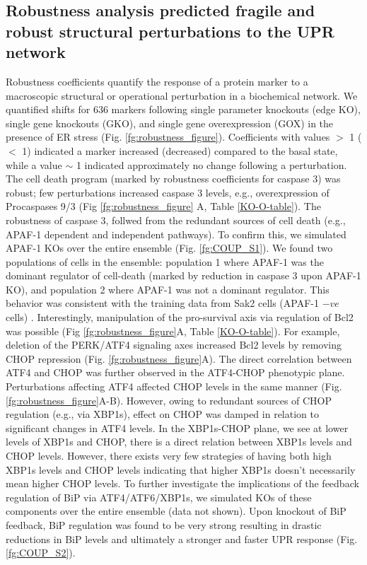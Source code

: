 \documentclass[fleqn,10pt]{wlscirep}
\begin{document}
\subsection*{Robustness analysis predicted fragile and robust structural perturbations to the UPR network}
Robustness coefficients quantify the response of a protein marker to a macroscopic structural or operational perturbation in a biochemical network.
We quantified shifts for 636 markers following single parameter knockouts (edge KO), single gene knockouts (GKO), and single gene overexpression (GOX) in the presence of ER stress (Fig. \ref{fg:robustness_figure}).
Coefficients with values $>$ 1 ($<$ 1) indicated a marker increased (decreased) compared to the basal state, while a value $\sim$ 1 indicated approximately no change following a perturbation.
The cell death program (marked by robustness coefficients for caspase 3) was robust; few perturbations increased caspase 3 levels, e.g., overexpression of Procaspases 9/3 (Fig \ref{fg:robustness_figure} A, Table \ref{KO-O-table}).
The robustness of caspase 3, follwed from the redundant sources of cell death (e.g., APAF-1 dependent and independent pathways).
To confirm this, we simulated APAF-1 KOs over the entire ensemble (Fig. \ref{fg:COUP_S1}).
We found two populations of cells in the ensemble: population 1 where APAF-1 was the dominant regulator of cell-death (marked by reduction in caspase 3 upon APAF-1 KO),
and population 2 where APAF-1 was not a dominant regulator.
This behavior was consistent with the training data from Sak2 cells (APAF-1 $-ve$ cells) \cite{rao2002cer}.
Interestingly, manipulation of the pro-survival axis via regulation of Bcl2 was possible (Fig \ref{fg:robustness_figure}A, Table \ref{KO-O-table}).
For example, deletion of the PERK/ATF4 signaling axes increased Bcl2 levels by removing CHOP repression (Fig. \ref{fg:robustness_figure}A).
The direct correlation between ATF4 and CHOP was further observed in the ATF4-CHOP phenotypic plane.
Perturbations affecting ATF4 affected CHOP levels in the same manner (Fig. \ref{fg:robustness_figure}A-B).
However, owing to redundant sources of CHOP regulation (e.g., via XBP1s), effect on CHOP was damped in relation to significant changes in ATF4 levels.
In the XBP1s-CHOP plane, we see at lower levels of XBP1s and CHOP, there is a direct relation between XBP1s levels and CHOP levels.
However, there exists very few strategies of having both high XBP1s levels and CHOP levels indicating that higher XBP1s doesn't necessarily mean higher CHOP levels.
To further investigate the implications of the feedback regulation of BiP via ATF4/ATF6/XBP1s, we simulated KOs of these components over the entire ensemble (data not shown).
Upon knockout of BiP feedback, BiP regulation was found to be very strong resulting in drastic reductions in BiP levels and ultimately a stronger and faster UPR response (Fig. \ref{fg:COUP_S2}).
\end{document}

